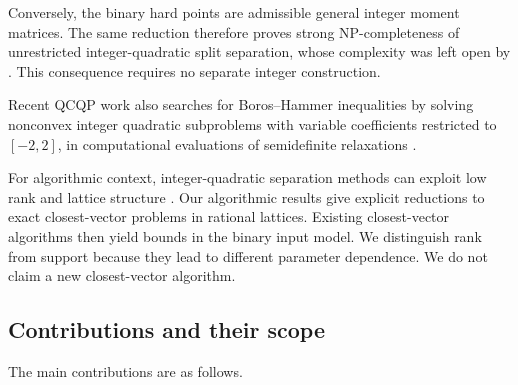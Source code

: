 Conversely, the binary hard points are admissible general integer
moment matrices.  The same reduction therefore proves strong
NP-completeness of unrestricted integer-quadratic split separation,
whose complexity was left open by \citet{BuchheimTraversi2015}.
This consequence requires no separate integer construction.

Recent QCQP work also searches for Boros--Hammer inequalities by
solving nonconvex integer quadratic subproblems with variable
coefficients restricted to $[-2,2]$, in computational evaluations of
semidefinite relaxations \citep[\S4.1.2]{DeyEtAl2026}.

For algorithmic context, integer-quadratic separation methods can
exploit low rank and lattice structure \citep{BuchheimTraversi2015}.
Our algorithmic results give explicit reductions to exact
closest-vector problems in rational lattices.  Existing
closest-vector algorithms then yield bounds in the binary input
model.  We distinguish rank from support because they lead to
different parameter dependence.  We do not claim a new
closest-vector algorithm.

\subsection{Contributions and their scope}

The main contributions are as follows.

